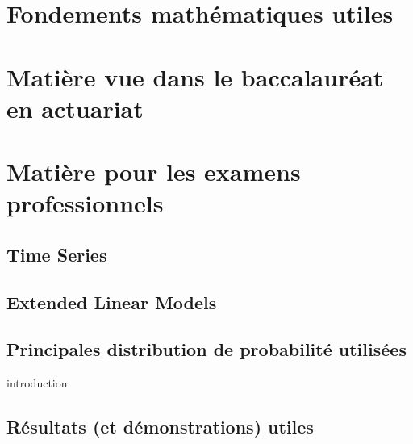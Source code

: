 \documentclass[12pt, french]{book}
\begin{document}


\frontmatter %



{
    \hypersetup{linkcolor=tocColor}
    \bfseries %
    \tableofcontents
}
\newpage

\mainmatter %

\part{Fondements mathématiques utiles}






\part{Matière vue dans le baccalauréat en actuariat}







\part{Matière pour les examens professionnels}

\chapter{Time Series}

\label{sec:Serie-Chronologique}

\chapter{Extended Linear Models}

\label{sec:Extended-Linear-Models}

\appendix
\chapter{Principales distribution de probabilité utilisées}
introduction


\chapter{Résultats (et démonstrations) utiles}



\end{document}

